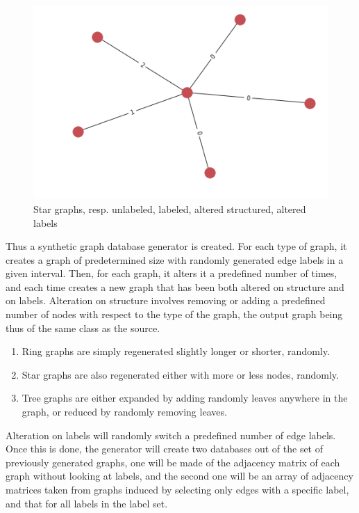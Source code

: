\documentclass{article}
\theoremstyle{definition}
\begin{document}
\begin{figure}[!htb]
\begin{multicols}{4}
		\includegraphics[width=\linewidth]{data/generated-graphs/star_altered_labels.png}\par
	\end{multicols}
	\caption{Star graphs, resp. unlabeled, labeled, altered structured, altered labels}
\end{figure}
Thus a synthetic graph database generator is created. For each type of graph, it creates a graph of predetermined size with randomly generated edge labels in a given interval. Then, for each graph, it alters it a predefined number of times, and each time creates a new graph that has been both altered on structure and on labels. Alteration on structure involves removing or adding a predefined number of nodes with respect to the type of the graph, the output graph being thus of the same class as the source. 
\begin{enumerate}
	\item Ring graphs are simply regenerated slightly longer or shorter, randomly.
	\item Star graphs are also regenerated either with more or less nodes, randomly.
	\item Tree graphs are either expanded by adding randomly leaves anywhere in the graph, or reduced by randomly removing leaves.
\end{enumerate}
Alteration on labels will randomly switch a predefined number of edge labels. Once this is done, the generator will create two databases out of the set of previously generated graphs, one will be made of the adjacency matrix of each graph without looking at labels, and the second one will be an array of adjacency matrices taken from graphs induced by selecting only edges with a specific label, and that for all labels in the label set.
\end{document}

